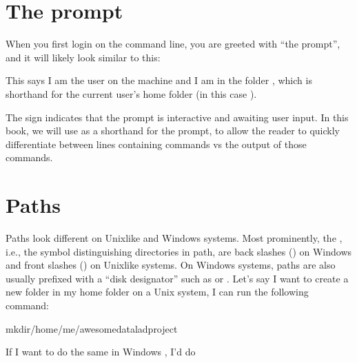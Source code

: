 \section{The prompt}
\label{\detokenize{intro/howto:the-prompt}}
\sphinxAtStartPar
When you first login on the command line, you are greeted with “the prompt”,
and it will likely look similar to this:

\sphinxAtStartPar
{}

\sphinxAtStartPar
This says I am the user  on the machine  and I am in the folder \sphinxcode{\sphinxupquote{\textasciitilde{}}},
which is shorthand for the current user’s home folder (in this case ).

\sphinxAtStartPar
The \sphinxcode{\sphinxupquote{\$}} sign indicates that the prompt is interactive and awaiting user input.
In this book, we will use \sphinxcode{\sphinxupquote{\$}} as a shorthand for the prompt, to allow
the reader to quickly differentiate between lines containing commands vs the
output of those commands.

\ignorespaces 

\section{Paths}
\label{\detokenize{intro/howto:paths}}\label{\detokenize{intro/howto:index-4}}
\sphinxAtStartPar
Paths look different on Unix\sphinxhyphen{}like and Windows systems.
Most prominently, the , i.e., the symbol distinguishing directories in path, are back slashes (\sphinxcode{\sphinxupquote{\textbackslash{}}}) on Windows and front slashes (\sphinxcode{\sphinxupquote{/}}) on Unix\sphinxhyphen{}like systems.
On Windows systems, paths are also usually prefixed with a “disk designator” such as  or .
Let’s say I want to create a new folder in my home folder on a Unix system,
I can run the following command:

\begin{sphinxVerbatim}[commandchars=\\\{\}]
mkdir/home/me/awesome\PYGZus{}datalad\PYGZus{}project
\end{sphinxVerbatim}

\sphinxAtStartPar
If I want to do the same in Windows , I’d do

